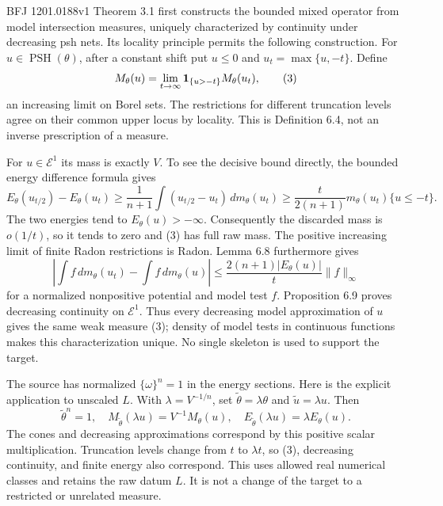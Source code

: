 \documentclass[11pt]{article}
\begin{document}
BFJ 1201.0188v1 Theorem 3.1 first constructs the bounded mixed operator from model intersection measures, uniquely characterized by continuity under decreasing psh nets. Its locality principle permits the following construction. For \(u\in\operatorname{PSH}(\theta)\), after a constant shift put \(u\leq0\) and \(u_t=\max\{u,-t\}\). Define
\[
 M_\theta(u)=\lim_{t\to\infty}
 {\bf1}_{\{u>-t\}}M_\theta(u_t),
 \tag{3}
\]
an increasing limit on Borel sets. The restrictions for different truncation levels agree on their common upper locus by locality. This is Definition 6.4, not an inverse prescription of a measure.

For \(u\in\mathcal E^1\) its mass is exactly \(V\). To see the decisive bound directly, the bounded energy difference formula gives
\[
 E_\theta(u_{t/2})-E_\theta(u_t)
 \geq\frac1{n+1}\int(u_{t/2}-u_t)\,dm_\theta(u_t)
 \geq\frac{t}{2(n+1)}m_\theta(u_t)\{u\leq-t\}.
 \tag{4}
\]
The two energies tend to \(E_\theta(u)>-\infty\). Consequently the discarded mass is \(o(1/t)\), so it tends to zero and (3) has full raw mass. The positive increasing limit of finite Radon restrictions is Radon. Lemma 6.8 furthermore gives
\[
 \left|\int f\,dm_\theta(u_t)-\int f\,dm_\theta(u)\right|
 \leq\frac{2(n+1)|E_\theta(u)|}{t}\|f\|_\infty
 \tag{5}
\]
for a normalized nonpositive potential and model test \(f\). Proposition 6.9 proves decreasing continuity on \(\mathcal E^1\). Thus every decreasing model approximation of \(u\) gives the same weak measure (3); density of model tests in continuous functions makes this characterization unique. No single skeleton is used to support the target.

The source has normalized \(\{\omega\}^n=1\) in the energy sections. Here is the explicit application to unscaled \(L\). With \(\lambda=V^{-1/n}\), set \(\widetilde\theta=\lambda\theta\) and \(\widetilde u=\lambda u\). Then
\[
 \widetilde\theta^n=1,\quad
 M_{\widetilde\theta}(\lambda u)=V^{-1}M_\theta(u),\quad
 E_{\widetilde\theta}(\lambda u)=\lambda E_\theta(u).
 \tag{6}
\]
The cones and decreasing approximations correspond by this positive scalar multiplication. Truncation levels change from \(t\) to \(\lambda t\), so (3), decreasing continuity, and finite energy also correspond. This uses allowed real numerical classes and retains the raw datum \(L\). It is not a change of the target to a restricted or unrelated measure.
\end{document}
